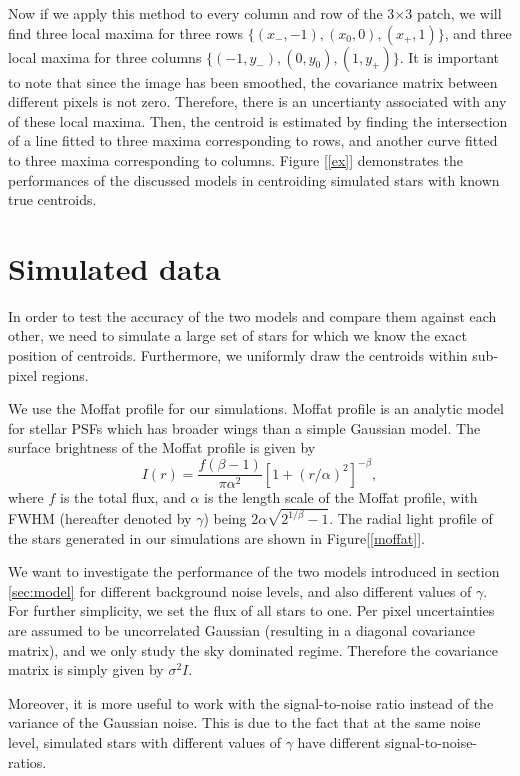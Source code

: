 \documentclass[12pt, preprint]{aastex}
\newcommand{\beq}{\begin{equation}}
\newcommand{\eeq}{\end{equation}}
\begin{document}
Now if we apply this method to every column and row of the 3$\times$3 patch, we will find three local maxima for three rows $\{(x_{-},-1), (x_{0},0),(x_{+},1)\}$, and three local maxima for three columns $\{(-1,y_{-}), (0,y_{0}),(1,y_{+})\}$. It is important to note that since the image has been smoothed, the covariance matrix between different pixels is not zero. Therefore, there is an uncertianty associated with any of these local maxima. Then, the centroid is estimated by finding the intersection of a line fitted to three maxima corresponding to rows, and another curve fitted to three maxima corresponding to columns. Figure [\ref{ex}] demonstrates the performances of the discussed models in centroiding simulated stars with known true centroids.

\section{Simulated data}\label{sec:data}

In order to test the accuracy of the two models and compare them against each other, we need to simulate a large set of stars for which we know the exact position of centroids. Furthermore, we uniformly draw the centroids within sub-pixel regions. 

We use the Moffat profile \citep{moffat} for our simulations. Moffat profile is an analytic model for stellar PSFs which has broader wings than a simple Gaussian model. The surface brightness of the Moffat profile is given by
\beq
I(r) = \frac{f(\beta -1)}{\pi \alpha^{2}}[1+(r/\alpha)^{2}]^{-\beta},
\label{mof}
\eeq
where $f$ is the total flux, and $\alpha$ is the length scale of the Moffat profile, with FWHM (hereafter denoted by $\gamma$) being $2\alpha\sqrt{2^{1/\beta}-1}$. The radial light profile of the stars generated in our simulations are shown in Figure[\ref{moffat}].

We want to investigate the performance of the two models introduced in section \ref{sec:model} for different background noise levels, and also different values of $\gamma$. For further simplicity, we set the flux of all stars to one. Per pixel uncertainties are assumed to be uncorrelated Gaussian (resulting in a diagonal covariance matrix), and we only study the sky dominated regime. Therefore the covariance matrix is simply given by $\sigma^{2}I$.

Moreover, it is more useful to work with the signal-to-noise ratio instead of the variance of the Gaussian noise. This is due to the fact that at the same noise level, simulated stars with different values of $\gamma$ have different signal-to-noise-ratios. 
\end{document}
